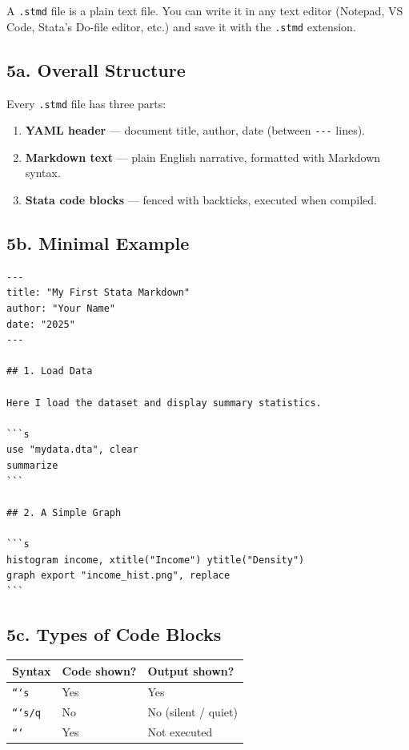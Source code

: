 \documentclass[paper=a4, fontsize=11pt]{scrartcl}
\begin{document}
A \texttt{.stmd} file is a plain text file. You can write it in any text editor
(Notepad, VS Code, Stata's Do-file editor, etc.) and save it with the
\texttt{.stmd} extension.

\subsection*{5a. Overall Structure}

Every \texttt{.stmd} file has three parts:

\begin{enumerate}
  \item \textbf{YAML header} --- document title, author, date (between \texttt{-{}-{}-} lines).
  \item \textbf{Markdown text} --- plain English narrative, formatted with Markdown syntax.
  \item \textbf{Stata code blocks} --- fenced with backticks, executed when compiled.
\end{enumerate}

\subsection*{5b. Minimal Example}

\begin{lstlisting}[style=stata]
---
title: "My First Stata Markdown"
author: "Your Name"
date: "2025"
---

## 1. Load Data

Here I load the dataset and display summary statistics.

```s
use "mydata.dta", clear
summarize
```

## 2. A Simple Graph

```s
histogram income, xtitle("Income") ytitle("Density")
graph export "income_hist.png", replace
```
\end{lstlisting}

\subsection*{5c. Types of Code Blocks}

\begin{center}
\begin{tabular}{lll}
\toprule
\textbf{Syntax} & \textbf{Code shown?} & \textbf{Output shown?} \\
\midrule
\texttt{```s}   & Yes & Yes \\
\texttt{```s/q} & No  & No  \quad (silent / quiet) \\
\texttt{```}    & Yes & Not executed \\
\bottomrule
\end{tabular}
\end{center}
\end{document}
